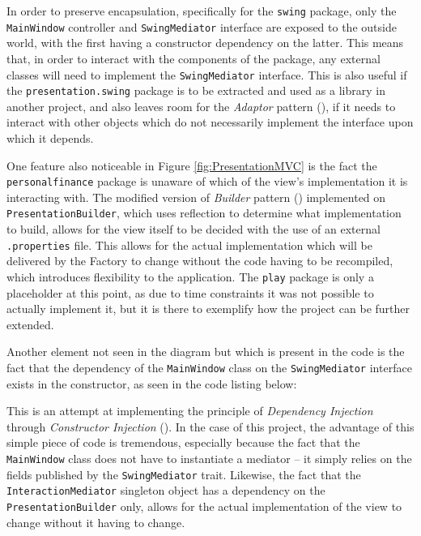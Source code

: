 \begin{sloppypar}
  In order to preserve encapsulation, specifically for the \texttt{swing}
  package, only the \texttt{MainWindow} controller and \texttt{SwingMediator}
  interface are exposed to the outside world, with the first having a
  constructor dependency on the latter. This means that, in order to interact
  with the components of the package, any external classes will need to
  implement the \texttt{SwingMediator} interface. This is also useful if the
  \texttt{presentation.swing} package is to be extracted and used as a library
  in another project, and also leaves room for the \emph{Adaptor} pattern
  (\cite[][p.~139]{gamma1995design}), if it needs to interact with other
  objects which do not necessarily implement the interface upon which it
  depends.
\end{sloppypar}

One feature also noticeable in Figure \ref{fig:PresentationMVC} is the fact the
\texttt{personalfinance} package is unaware of which of the view's
implementation it is interacting with. The modified version of 
\emph{Builder} pattern (\cite[][pp.~37-38]{lokke2009scala}) implemented on
\texttt{PresentationBuilder}, which uses reflection to determine what
implementation to build, allows for the view itself to be decided with the use
of an external \texttt{.properties} file. This allows for the actual
implementation which will be delivered by the Factory to change without the
code having to be recompiled, which introduces flexibility to the application.
The \texttt{play} package is only a placeholder at this point, as due to time
constraints it was not possible to actually implement it, but it is there to
exemplify how the project can be further extended.

Another element not seen in the diagram but which is present in the code is the
fact that the dependency of the \texttt{MainWindow} class on the
\texttt{SwingMediator} interface exists in the constructor, as seen in the code
listing below:
{
  \small
  
}

This is an attempt at implementing the principle of \emph{Dependency Injection}
through \emph{Constructor Injection} (\cite[][]{fowler2004inversion}). In the
case of this project, the advantage of this simple piece of code is tremendous,
especially because the fact that the \texttt{MainWindow} class does not have to
instantiate a mediator -- it simply relies on the fields published by the
\texttt{SwingMediator} trait. Likewise, the fact that the
\texttt{InteractionMediator} singleton object has a dependency on the
\texttt{PresentationBuilder} only, allows for the actual implementation of the
view to change without it having to change.


